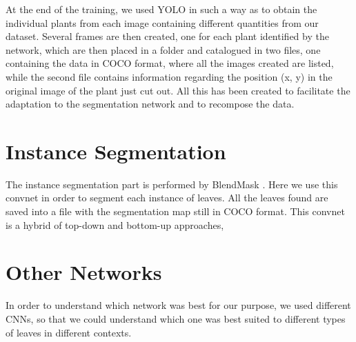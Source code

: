 At the end of the training, we used YOLO in such a way as to obtain the individual plants from each image containing different quantities from our dataset. Several
frames are then created, one for each plant identified by the network, which are then placed in a folder and catalogued in two files, one containing the data in COCO
\cite{lin2014microsoft} format, where all the images created are listed, while the second file contains information regarding the position (x, y) in the original image
of the plant just cut out. All this has been created to facilitate the adaptation to the segmentation network and to recompose the data.


\section{Instance Segmentation}
The instance segmentation part is performed by BlendMask \cite{chen2020blendmask}. Here we use this convnet in order to segment each instance of leaves. All the leaves found
are saved into a file with the segmentation map still in COCO format. This convnet is a hybrid of top-down and bottom-up approaches, 



\section{Other Networks}
In order to understand which network was best for our purpose, we used different CNNs, so that we could understand which one was best suited to different types of leaves
in different contexts.






